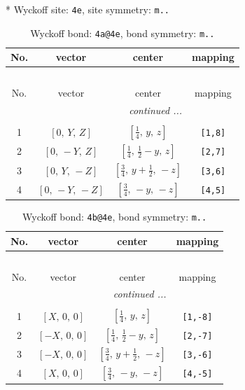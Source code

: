 \documentclass[fleqn,8pt]{jsarticle}
\begin{document}
* Wyckoff site: {\tt 4e}, site symmetry: {\tt m..}
\renewcommand{\arraystretch}{1.2}
\begin{longtable}{cccc}
\caption{Wyckoff bond: {\tt 4a@4e}, bond symmetry: {\tt m..}}
 \\
 \hline \hline
No. & vector & center & mapping \\ \hline \endfirsthead

\multicolumn{3}{l}{\tablename\ \thetable{}} \\
 \hline \hline
No. & vector & center & mapping \\ \hline \endhead

 \hline \hline
\multicolumn{3}{r}{\footnotesize\it continued ...} \\ \endfoot

 \hline \hline
\multicolumn{3}{r}{} \\ \endlastfoot

1 & $\left[ 0,\, Y,\, Z \right]$ & $\left[ \frac{1}{4},\, y,\, z \right]$ & {\tt [1,8]} \\ \hline
2 & $\left[ 0,\, - Y,\, Z \right]$ & $\left[ \frac{1}{4},\, \frac{1}{2} - y,\, z \right]$ & {\tt [2,7]} \\ \hline
3 & $\left[ 0,\, Y,\, - Z \right]$ & $\left[ \frac{3}{4},\, y + \frac{1}{2},\, - z \right]$ & {\tt [3,6]} \\ \hline
4 & $\left[ 0,\, - Y,\, - Z \right]$ & $\left[ \frac{3}{4},\, - y,\, - z \right]$ & {\tt [4,5]} \\
\end{longtable}
\renewcommand{\arraystretch}{1.2}
\begin{longtable}{cccc}
\caption{Wyckoff bond: {\tt 4b@4e}, bond symmetry: {\tt m..}}
 \\
 \hline \hline
No. & vector & center & mapping \\ \hline \endfirsthead

\multicolumn{3}{l}{\tablename\ \thetable{}} \\
 \hline \hline
No. & vector & center & mapping \\ \hline \endhead

 \hline \hline
\multicolumn{3}{r}{\footnotesize\it continued ...} \\ \endfoot

 \hline \hline
\multicolumn{3}{r}{} \\ \endlastfoot

1 & $\left[ X,\, 0,\, 0 \right]$ & $\left[ \frac{1}{4},\, y,\, z \right]$ & {\tt [1,-8]} \\ \hline
2 & $\left[ - X,\, 0,\, 0 \right]$ & $\left[ \frac{1}{4},\, \frac{1}{2} - y,\, z \right]$ & {\tt [2,-7]} \\ \hline
3 & $\left[ - X,\, 0,\, 0 \right]$ & $\left[ \frac{3}{4},\, y + \frac{1}{2},\, - z \right]$ & {\tt [3,-6]} \\ \hline
4 & $\left[ X,\, 0,\, 0 \right]$ & $\left[ \frac{3}{4},\, - y,\, - z \right]$ & {\tt [4,-5]} \\
\end{longtable}
\end{document}
